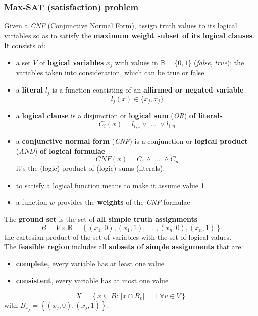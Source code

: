 \documentclass[11pt]{article}
\begin{document}
	\subsubsection{Max-SAT (satisfaction) problem}
	Given a \textit{CNF} (Conjunctive Normal Form), assign truth values to its logical variables so as to satisfy the \textbf{maximum weight subset of its logical clauses}. It consists of: 
	\begin{itemize}
		\item a set $V$ of \textbf{logical variables} $x_j$ with values in $\mathbb{B} = \{0, 1\}$ (\textit{false}, \textit{true}); the variables taken into consideration, which can be true or false
		\item a \textbf{literal} $l_j$ is a function consisting of an \textbf{affirmed or negated variable}
		$$ l_j (x) \in \{x_j, \overline{x}_j\}$$
		\item a \textbf{logical clause} is a disjunction or \textbf{logical sum} (\textit{OR}) \textbf{of literals}
		$$ C_i (x) = l_{i,1} \vee \; ... \; \vee l_{i,n}$$
		\item a \textbf{conjunctive normal form} (\textit{CNF}) is a conjunction or \textbf{logical product} (\textit{AND}) \textbf{of logical formulae}
		$$ CNF (x) = C_1 \wedge \; ... \; \wedge C_n $$
		it's the (logic) product of (logic) sums (literals).\\
		\item to satisfy a logical function means to make it assume value 1
		\item a function $w$ provides the \textbf{weights} of the \textit{CNF} formulae
	\end{itemize}
	
	The \textbf{ground set} is the set of \textbf{all simple truth assignments}
	$$ B = V \times \mathbb{B} = \left\{(x_1, 0), (x_1, 1), \; ... \; , (x_n, 0), (x_n, 1)\right\}$$
	the cartesian product of the set of variables with the set of logical values.\\
	
	The \textbf{feasible region} includes all \textbf{subsets of simple assignments} that are:
	\begin{itemize}
		\item \textbf{complete}, every variable has at least one value
		\item \textbf{consistent}, every variable has at most one value
	\end{itemize}
	$$ X = \left\{x \subseteq B : \, |x \cap B_v| = 1 \; \forall v \in V \right\}$$
	with $B_{x_j} = \left\{(x_j, 0), (x_j, 1)\right\}$.\\
	
\end{document}
